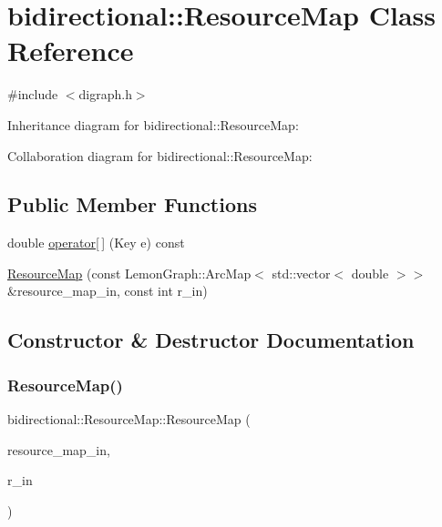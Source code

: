 \hypertarget{classbidirectional_1_1ResourceMap}{}\section{bidirectional\+:\+:Resource\+Map Class Reference}
\label{classbidirectional_1_1ResourceMap}


{\ttfamily \#include $<$digraph.\+h$>$}



Inheritance diagram for bidirectional\+:\+:Resource\+Map\+:


Collaboration diagram for bidirectional\+:\+:Resource\+Map\+:
\subsection*{Public Member Functions}
\begin{DoxyCompactItemize}
\item 
double \hyperlink{classbidirectional_1_1ResourceMap_a0da7ed255fdf2bbc1a7bfc190c828bc4}{operator\mbox{[}$\,$\mbox{]}} (Key e) const
\item 
\hyperlink{classbidirectional_1_1ResourceMap_a8af0345e49b30df97d49d920730b9d9d}{Resource\+Map} (const Lemon\+Graph\+::\+Arc\+Map$<$ std\+::vector$<$ double $>$$>$ \&resource\+\_\+map\+\_\+in, const int r\+\_\+in)
\end{DoxyCompactItemize}


\subsection{Constructor \& Destructor Documentation}
\mbox{\label{classbidirectional_1_1ResourceMap_a8af0345e49b30df97d49d920730b9d9d}} 
\subsubsection{\texorpdfstring{Resource\+Map()}{ResourceMap()}}
{\footnotesize\ttfamily bidirectional\+::\+Resource\+Map\+::\+Resource\+Map (\begin{DoxyParamCaption}\item[{const Lemon\+Graph\+::\+Arc\+Map$<$ std\+::vector$<$ double $>$$>$ \&}]{resource\+\_\+map\+\_\+in,  }\item[{const int}]{r\+\_\+in }\end{DoxyParamCaption})\hspace{0.3cm}{\ttfamily [inline]}}



